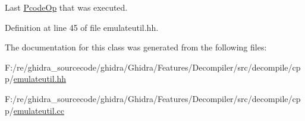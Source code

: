 Last \mbox{\hyperlink{class_pcode_op}{Pcode\+Op}} that was executed. 



Definition at line 45 of file emulateutil.\+hh.



The documentation for this class was generated from the following files\+:\begin{DoxyCompactItemize}
\item 
F\+:/re/ghidra\+\_\+sourcecode/ghidra/\+Ghidra/\+Features/\+Decompiler/src/decompile/cpp/\mbox{\hyperlink{emulateutil_8hh}{emulateutil.\+hh}}\item 
F\+:/re/ghidra\+\_\+sourcecode/ghidra/\+Ghidra/\+Features/\+Decompiler/src/decompile/cpp/\mbox{\hyperlink{emulateutil_8cc}{emulateutil.\+cc}}\end{DoxyCompactItemize}
